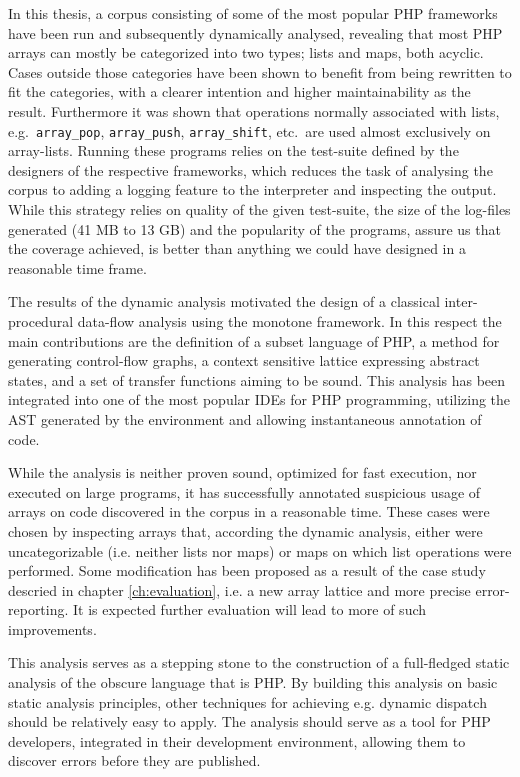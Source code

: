 

In this thesis, a corpus consisting of some of the most popular PHP frameworks have been run and subsequently dynamically analysed, revealing that most PHP arrays can mostly be categorized into two types; lists and maps, both acyclic. Cases outside those categories have been shown to benefit from being rewritten to fit the categories, with a clearer intention and higher maintainability as the result. Furthermore it was shown that operations normally associated with lists, e.g.\ \texttt{array\_pop}, \texttt{array\_push}, \texttt{array\_shift}, etc.\, are used almost exclusively on array-lists. Running these programs relies on the test-suite defined by the designers of the respective frameworks, which reduces the task of analysing the corpus to adding a logging feature to the interpreter and inspecting the output. While this strategy relies on quality of the given test-suite, the size of the log-files generated (41 MB to 13 GB) and the popularity of the programs, assure us that the coverage achieved, is better than anything we could have designed in a reasonable time frame. 


The results of the dynamic analysis motivated the design of a classical inter-procedural data-flow analysis using the monotone framework. In this respect the main contributions are the definition of a subset language of PHP, a method for generating control-flow graphs, a context sensitive lattice expressing abstract states, and a set of transfer functions aiming to be sound. This analysis has been integrated into one of the most popular IDEs for PHP programming, utilizing the AST generated by the environment and allowing instantaneous annotation of code. 

While the analysis is neither proven sound, optimized for fast execution, nor executed on large programs, it has successfully annotated suspicious usage of arrays on code discovered in the corpus in a reasonable time. These cases were chosen by inspecting arrays that, according the dynamic analysis, either were uncategorizable (i.e. neither lists nor maps) or maps on which list operations were performed.  Some modification has been proposed as a result of the case study descried in chapter \ref{ch:evaluation}, i.e. a new array lattice and more precise error-reporting. It is expected further evaluation will lead to more of such improvements.

This analysis serves as a stepping stone to the construction of a full-fledged static analysis of the obscure language that is PHP. By building this analysis on basic static analysis principles, other techniques for achieving e.g. dynamic dispatch should be relatively easy to apply. The analysis should serve as a tool for PHP developers, integrated in their development environment, allowing them to discover errors before they are published. 




